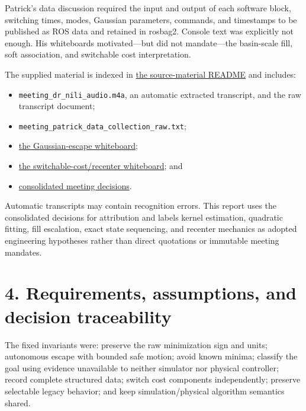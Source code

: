 \documentclass[
  10pt,
  letterpaper,
]{article}
\providecommand{\tightlist}{%
  \setlength{\itemsep}{0pt}\setlength{\parskip}{0pt}}
\begin{document}
Patrick's data discussion required the input and output of each software block,
switching times, modes, Gaussian parameters, commands, and timestamps to be
published as ROS data and retained in rosbag2. Console text was explicitly not
enough. His whiteboards motivated---but did not mandate---the basin-scale fill,
soft association, and switchable cost interpretation.

The supplied material is indexed in
\href{../../../DSIM_GESC_Gaussian_Codex_Implementation_Package/source_material/README.md}{the source-material README}
and includes:

\begin{itemize}
\tightlist
\item
  \nolinkurl{meeting\_dr\_nili\_audio.m4a}, an automatic extracted transcript, and the raw
  transcript document;
\item
  \nolinkurl{meeting\_patrick\_data\_collection\_raw.txt};
\item
  \href{../../../DSIM_GESC_Gaussian_Codex_Implementation_Package/source_material/whiteboard_gaussian_escape.jpg}{the Gaussian-escape whiteboard};
\item
  \href{../../../DSIM_GESC_Gaussian_Codex_Implementation_Package/source_material/whiteboard_switchable_cost_recenter.jpeg}{the switchable-cost/recenter whiteboard}; and
\item
  \href{../../../DSIM_GESC_Gaussian_Codex_Implementation_Package/source_material/CONSOLIDATED_MEETING_DECISIONS.md}{consolidated meeting decisions}.
\end{itemize}

Automatic transcripts may contain recognition errors. This report uses the
consolidated decisions for attribution and labels kernel estimation,
quadratic fitting, fill escalation, exact state sequencing, and recenter
mechanics as adopted engineering hypotheses rather than direct quotations or
immutable meeting mandates.

\section{4. Requirements, assumptions, and decision traceability}\label{requirements-assumptions-and-decision-traceability}

The fixed invariants were: preserve the raw minimization sign and units;
autonomous escape with bounded safe motion; avoid known minima; classify the
goal using evidence unavailable to neither simulator nor physical controller;
record complete structured data; switch cost components independently;
preserve selectable legacy behavior; and keep simulation/physical algorithm
semantics shared.
\end{document}

